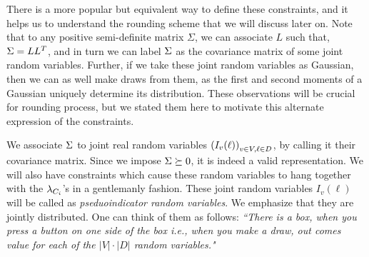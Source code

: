 There is a more popular but equivalent way to define these constraints, and it helps us to understand the rounding scheme that we will discuss later on. 
Note that to any positive semi-definite matrix $\Sigma$, we can associate $L$ such that, $\Sigma = LL^T$, and in turn we can label $\Sigma$ as the covariance matrix of some joint random variables. 
Further, if we take these joint random variables as Gaussian, then we can as well make draws from them, as the first and second moments of a Gaussian  uniquely determine its distribution. 
These observations will be crucial for rounding process, but we stated them here to motivate this alternate expression of the constraints. 

We associate $\Sigma$ to joint real random variables $\left(I_v(\ell)\right)_{v\in V, \ell \in D}$, by calling it their covariance matrix. Since we impose $\Sigma \succeq 0$, it is indeed a valid representation. 
We will also have constraints which cause these random variables to hang together with the $\lambda_{C_i}$'s in a gentlemanly fashion. 
These joint random variables $I_v(\ell)$ will be called as \textit{pseduoindicator random variables}. 
We emphasize that they are jointly distributed. 
One can think of them as follows: 
\textit{``There is a box, when you press a button on one side of the box i.e., when you make a draw, out comes value for each of the $|V| \cdot |D|$ random variables."}

